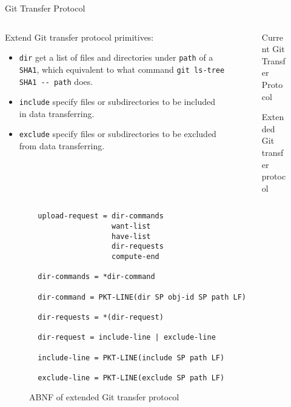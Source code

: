 \documentclass[final]{beamer}
\begin{document}
\begin{frame}[t]
\begin{columns}[t]
\begin{column}{.5\linewidth}
\begin{block}{Git Transfer Protocol}
\begin{columns}[T]
\begin{column}{.5\textwidth}
Extend Git transfer protocol primitives:

\begin{itemize}
  \item \verb|dir| get a list of files and directories under \verb|path| of a
    \verb|SHA1|, which equivalent to what command
    \verb|git ls-tree SHA1 -- path| does.

  \item \verb|include| specify files or subdirectories to be included in data
    transferring.

  \item \verb|exclude| specify files or subdirectories to be excluded from data
    transferring.
\end{itemize}
          \end{column}
          \begin{column}{.5\textwidth}
            \begin{figure} \centering
              \caption{Current Git Transfer Protocol}
            \end{figure}
            \begin{figure} \centering
              \caption{Extended Git transfer protocol}
            \end{figure}
          \end{column}
        \end{columns}
\begin{figure}[htpb]
  \centering
  \begin{verbatim}
  upload-request = dir-commands
                   want-list
                   have-list
                   dir-requests
                   compute-end

  dir-commands = *dir-command

  dir-command = PKT-LINE(dir SP obj-id SP path LF)

  dir-requests = *(dir-request)

  dir-request = include-line | exclude-line

  include-line = PKT-LINE(include SP path LF)

  exclude-line = PKT-LINE(exclude SP path LF)
  \end{verbatim}
  \caption{ABNF of extended Git transfer protocol}
  \label{fig:git-proto-ext-ABNF}
\end{figure}


\end{block}
\end{column}
\end{columns}
\end{frame}
\end{document}
